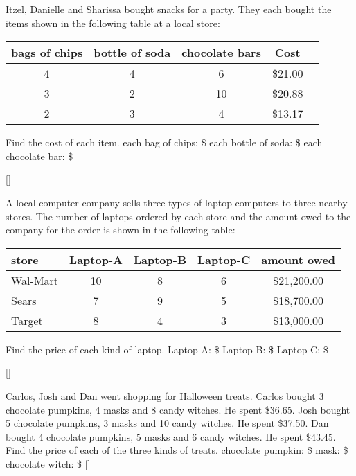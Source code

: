 \documentclass[12pt,letterpaper]{memoir}
\begin{document}
%
%
\myWideProblemWithContent
{
    Itzel, Danielle and Sharissa bought snacks for a party. 
    They each bought the items shown in the
    following table at a local  store:
    \begin{center}
        \small
        \begin{tabular}{ccccc}
            bags of chips & bottle of soda & chocolate bars & Cost \\
            \toprule
            4 & 4 & 6  & \$21.00  \\
            3 & 2 & 10 & \$20.88  \\
            2 & 3 &  4 & \$13.17  \\
        \end{tabular}
    \end{center}
    Find the cost of each item.
    \myBetterSystemTable
    \small
    each bag of chips: \$
    \hfill 
    each bottle of soda: \$
    \hfill 
    each chocolate bar: \$
    }[\small]


%
%
\myWideProblemWithContent
{
    A local computer company sells three types of laptop computers 
    to three nearby stores. 
    The number of laptops ordered by each store and the amount owed to the
    company for the order is shown in the following table:
    \begin{center}
        \small
        \begin{tabular}{lcccc}
            store & Laptop-A & Laptop-B & Laptop-C & amount owed \\
            \toprule
            Wal-Mart & 10 & 8 & 6 & \$21,200.00  \\
            Sears    & 7  & 9 & 5 & \$18,700.00  \\
            Target   & 8  & 4 & 3 & \$13,000.00  \\
        \end{tabular}
    \end{center}
    Find the price of each kind of laptop.
    \myBetterSystemTable
    \small
    Laptop-A: \$
    \hfil 
    Laptop-B: \$
    \hfil 
    Laptop-C: \$
    }[\small]


%
%
\myWideProblemWithContent
{
    Carlos, Josh and Dan went shopping for Halloween treats. 
    Carlos bought 3 chocolate pumpkins, 4 masks and 8 candy witches. 
    He spent \$36.65. 
    Josh bought 5 chocolate pumpkins, 3 masks and 10 candy witches. 
    He spent \$37.50. 
    Dan bought 4 chocolate pumpkins, 5 masks and 6 candy witches. 
    He spent \$43.45. 
    Find the price of each of the three kinds of treats.
    \myBetterSystemTable
    \small
    chocolate pumpkin: \$
    \hfill 
    mask: \$
    \hfill 
    chocolate witch: \$
    }[\small]
\end{document}

